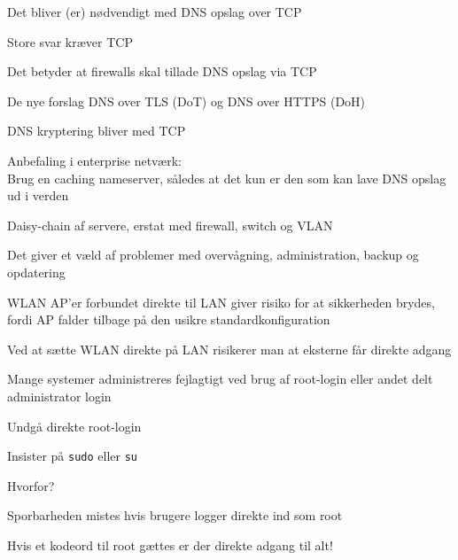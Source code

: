 \documentclass[Screen16to9,17pt]{foils}
\begin{document}

\begin{list1}
\item Det bliver (er) nødvendigt med DNS opslag over TCP
\vskip 1cm
\item Store svar kræver TCP
\item Det betyder at firewalls skal tillade DNS opslag via TCP
\vskip 1cm
\item De nye forslag DNS over TLS (DoT) og DNS over HTTPS (DoH)
\item DNS kryptering bliver med TCP
\vskip 1cm
\item Anbefaling i enterprise netværk:\\
Brug en caching nameserver, således at det kun er den som kan lave DNS opslag ud i verden

\end{list1}



\begin{list1}
\item Daisy-chain af servere, erstat med firewall, switch og VLAN
\item Det giver et væld af problemer med overvågning, administration, backup og opdatering
\end{list1}



\begin{list1}
\item WLAN AP'er forbundet direkte til LAN giver risiko for at sikkerheden brydes, fordi AP falder tilbage på den usikre standardkonfiguration
\item Ved at sætte WLAN direkte på LAN risikerer man at eksterne får direkte adgang
\end{list1}




\begin{list1}
\item Mange systemer administreres fejlagtigt ved brug af
  root-login eller andet delt administrator login
\item Undgå direkte root-login
\item Insister på \verb+sudo+ eller \verb+su+
\item Hvorfor?
\begin{list2}
\item Sporbarheden mistes hvis brugere logger direkte ind som root
\item Hvis et kodeord til root gættes er der direkte adgang til alt!
\end{list2}
\end{list1}
\end{document}
